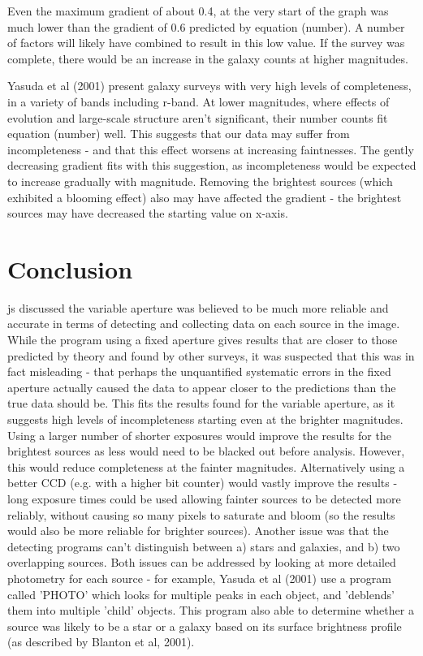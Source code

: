 \documentclass[a4paper,11pt,twoside]{article}
\begin{document}
Even the maximum gradient of about 0.4, at the very start of the graph was much lower than the gradient of 0.6 predicted by equation (number). A number of factors will likely have combined to result in this low value. If the survey was complete, there would be an increase in the galaxy counts at higher magnitudes.


Yasuda\cite{yasuda} et al (2001) present galaxy surveys with very high levels of completeness, in a variety of bands including r-band. At lower magnitudes, where effects of evolution and large-scale structure aren't significant, their number counts fit equation (number) well. 
This suggests that our data may suffer from incompleteness - and that this effect worsens at increasing faintnesses.
The gently decreasing gradient fits with this suggestion, as incompleteness would be expected to  increase gradually with magnitude.
Removing the brightest sources (which exhibited a blooming effect) also may have affected the gradient - the brightest sources may have decreased the starting value on x-axis.

\section{Conclusion}

js discussed the variable aperture was believed to be much more reliable and accurate in terms of detecting and collecting data on each source in the image.
While the program using a fixed aperture gives results that are closer to those predicted by theory and found by other surveys, it was suspected that this was in fact misleading - that perhaps the unquantified systematic errors in the fixed aperture actually caused the data to appear closer to the predictions than the true data should be.
This fits the results found for the variable aperture, as it suggests high levels of incompleteness starting even at the brighter magnitudes.
Using a larger number of shorter exposures would improve the results for the brightest sources as less would need to be blacked out before analysis. However, this would reduce completeness at the fainter magnitudes.
Alternatively using a better CCD (e.g. with a higher bit counter) would vastly improve the results - long exposure times could be used allowing fainter sources to be detected more reliably, without causing so many pixels to saturate and bloom (so the results would also be more reliable for brighter sources).
Another issue was that the detecting programs can't distinguish between a) stars and galaxies, and b) two overlapping sources. Both issues can be addressed by looking at more detailed photometry for each source - for example, Yasuda et al (2001) use a program called 'PHOTO' which looks for multiple peaks in each object, and 'deblends' them into multiple 'child' objects. This program also able to determine whether a source was likely to be a star or a galaxy based on its surface brightness profile (as described by Blanton et al, 2001).
\end{document}
